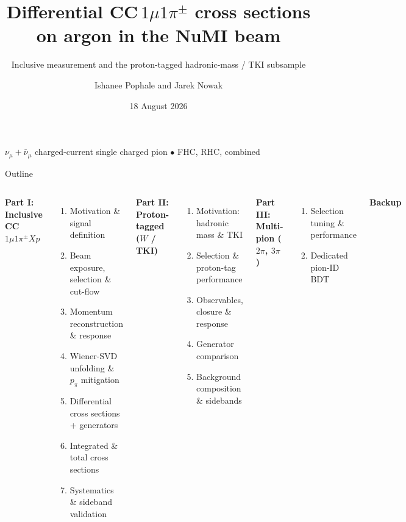 \documentclass[aspectratio=169,10pt]{beamer}
\title[CC$1\mu1\pi^{\pm}$]{Differential CC$\,1\mu1\pi^{\pm}$ cross sections on argon in the NuMI beam}
\subtitle{Inclusive measurement and the proton-tagged hadronic-mass / TKI subsample}
\author[Pophale, Nowak]{Ishanee Pophale and Jarek Nowak}
\institute{Lancaster University}
\date{18 August 2026}
\begin{document}
{
\begin{frame}[plain]
  \titlepage
  \begin{center}\small\color{ubdark}
  $\nu_\mu+\bar\nu_\mu$ charged-current single charged pion \;$\bullet$\; FHC, RHC, combined
  \end{center}
\end{frame}}

\begin{frame}{Outline}
  \begin{columns}[T]
  \textbf{\color{ubred}Part I: Inclusive CC$1\mu1\pi^{\pm}Xp$}
  \begin{enumerate}\small
    \item Motivation \& signal definition
    \item Beam exposure, selection \& cut-flow
    \item Momentum reconstruction \& response
    \item Wiener-SVD unfolding \& $p_\pi$ mitigation
    \item Differential cross sections + generators
    \item Integrated \& total cross sections
    \item Systematics \& sideband validation
  \end{enumerate}
  \textbf{\color{ubred}Part II: Proton-tagged ($W$ / TKI)}
  \begin{enumerate}\small
    \item Motivation: hadronic mass \& TKI
    \item Selection \& proton-tag performance
    \item Observables, closure \& response
    \item Generator comparison
    \item Background composition \& sidebands
  \end{enumerate}
  \vspace{2mm}
  \textbf{\color{ubred}Part III: Multi-pion ($2\pi$, $3\pi$)}
  \begin{enumerate}\small
    \item Selection tuning \& performance
    \item Dedicated pion-ID BDT
  \end{enumerate}
  \vspace{2mm}
  \textbf{\color{ubred}Backup}
  \end{columns}
\end{frame}
\end{document}
